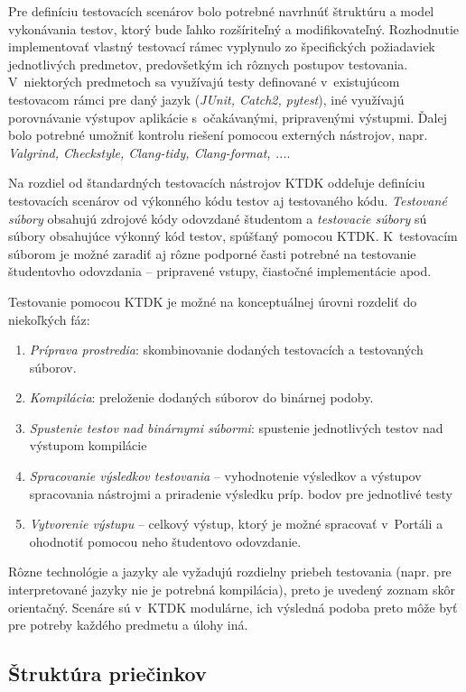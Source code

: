 \documentclass[
  digital, %
  oneside, %
  table,   %
  lof,     %
  lot,   %
]{fithesis3}
\begin{document}
Pre definíciu testovacích scenárov bolo potrebné navrhnúť štruktúru a model vykonávania testov, ktorý bude ľahko rozšíriteľný a modifikovateľný. Rozhodnutie implementovať vlastný testovací rámec vyplynulo zo špecifických požiadaviek jednotlivých predmetov, predovšetkým ich rôznych postupov testovania. V~niektorých predmetoch sa využívajú testy definované v~existujúcom testovacom rámci pre daný jazyk (\emph{JUnit, Catch2, pytest}), iné využívajú porovnávanie výstupov aplikácie s~očakávanými, pripravenými výstupmi. Ďalej bolo potrebné umožniť kontrolu riešení pomocou externých nástrojov, napr. \emph{Valgrind, Checkstyle, Clang-tidy, Clang-format, ...}.

Na rozdiel od štandardných testovacích nástrojov KTDK oddeľuje definíciu testovacích scenárov od výkonného kódu testov aj testovaného kódu. \emph{Testované súbory} obsahujú zdrojové kódy odovzdané študentom a \emph{testovacie súbory} sú súbory obsahujúce výkonný kód testov, spúšťaný pomocou KTDK. K~testovacím súborom je možné zaradiť aj rôzne podporné časti potrebné na testovanie študentovho odovzdania -- pripravené vstupy, čiastočné implementácie apod.

Testovanie pomocou KTDK je možné na konceptuálnej úrovni rozdeliť do niekoľkých fáz:
\begin{enumerate}
    \item \emph{Príprava prostredia}: skombinovanie dodaných testovacích a testovaných súborov.
    \item \emph{Kompilácia}: preloženie dodaných súborov do binárnej podoby.
    \item \emph{Spustenie testov nad binárnymi súbormi}: spustenie jednotlivých testov nad výstupom kompilácie
    \item \emph{Spracovanie výsledkov testovania} -- vyhodnotenie výsledkov a výstupov spracovania nástrojmi a priradenie výsledku príp. bodov pre jednotlivé testy
    \item \emph{Vytvorenie výstupu} -- celkový výstup, ktorý je možné spracovať v~Portáli a ohodnotiť pomocou neho študentovo odovzdanie.
\end{enumerate}

Rôzne technológie a jazyky ale vyžadujú rozdielny priebeh testovania (napr. pre interpretované jazyky nie je potrebná kompilácia), preto je uvedený zoznam skôr orientačný. Scenáre sú v~KTDK modulárne, ich výsledná podoba preto môže byť pre potreby každého predmetu a úlohy iná. 

\subsection{Štruktúra priečinkov}
\end{document}
